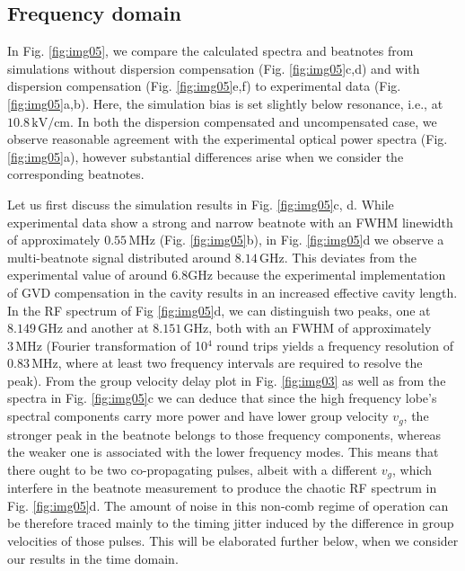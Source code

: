 \documentclass[10pt]{article}
\begin{document}
	\subsection{Frequency domain}
	In Fig. \ref{fig:img05}, we compare the calculated spectra and beatnotes from
	simulations without dispersion compensation (Fig. \ref{fig:img05}c,d) and with
	dispersion compensation (Fig. \ref{fig:img05}e,f) to experimental data (Fig.
	\ref{fig:img05}a,b). Here, the simulation bias is set slightly below
	resonance, i.e., at $10.8{\,}\mathrm{kV}/\mathrm{cm}$. In both the dispersion
	compensated and uncompensated case, we observe reasonable agreement
	with the experimental optical power spectra (Fig. \ref{fig:img05}a), however
	substantial differences arise when we consider the corresponding
	beatnotes.

	
	Let us first discuss the simulation results in Fig. \ref{fig:img05}c, d. While
	experimental data show a strong and narrow beatnote with an FWHM linewidth of
	approximately $0.55{\,}\mathrm{MHz}$ (Fig. \ref{fig:img05}b), in Fig.
	\ref{fig:img05}d we observe a multi-beatnote signal distributed around
	$8.14{\,}\mathrm{GHz}$. This deviates from the experimental value of
	around\textrm{ }$6.8${\thinspace}$\mathrm{GHz}$ because the experimental
	implementation of GVD compensation in the cavity results in an increased
	effective cavity length. In the RF spectrum of Fig \ref{fig:img05}d, we can
	distinguish two peaks, one at $8.149{\,}\mathrm{GHz}$ and another at
	$8.151{\,}\mathrm{GHz}$, both with an FWHM of approximately $3{\,}%
	\mathrm{MHz}$ (Fourier transformation of 10$^{4}$ round trips yields a
	frequency resolution of $0.83{\,}\mathrm{MHz}$, where at least two frequency
	intervals are required to resolve the peak). From the group velocity delay
	plot in Fig. \ref{fig:img03} as well as from the spectra in Fig.
	\ref{fig:img05}c we can deduce that since the high frequency lobe's spectral
	components carry more power and have lower group velocity $v_{g}$, the
	stronger peak in the beatnote belongs to those frequency components, whereas
	the weaker one is associated with the lower frequency modes. This means that
	there ought to be two co-propagating pulses, albeit with a different $v_{g}$,
	which interfere in the beatnote measurement to produce the chaotic RF spectrum
	in Fig. \ref{fig:img05}d. The amount of noise in this non-comb regime of
	operation can be therefore traced mainly to the timing jitter induced by the
	difference in group velocities of those pulses. This will be elaborated
	further below, when we consider our results in the time domain.
	
\end{document}
